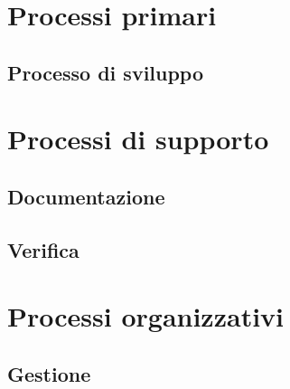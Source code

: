\documentclass[a4paper,titlepage]{article}
\begin{document}
\maketitle

\begin{diario}
\end{diario}

\newpage
\tableofcontents
\newpage


\section{Processi primari}
 \subsection{Processo di sviluppo}
  
\section{Processi di supporto} 
 \subsection{Documentazione}  
 
 \subsection{Verifica} 
\section{Processi organizzativi}
 \subsection{Gestione}
  
\end{document}
